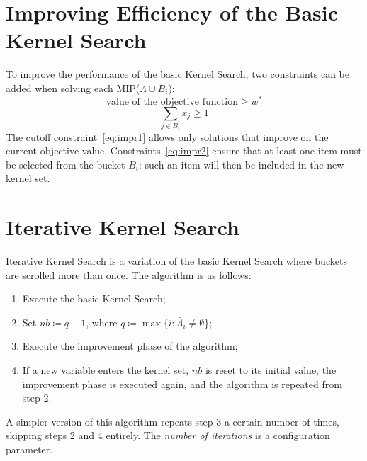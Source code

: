 \section{Improving Efficiency of the Basic Kernel Search}\label{sec:improving-efficiency}
To improve the performance of the basic Kernel Search, two constraints can be added
when solving each MIP(\(\Lambda \cup B_{i}\)):
\begin{equation}
    \label{eq:impr1}
    \text{value of the objective function} \geq w^{*}
\end{equation}
\begin{equation}
    \label{eq:impr2}
    \sum_{j \in B_{i}} x_{j} \geq 1
\end{equation}
The cutoff constraint~\eqref{eq:impr1} allows only solutions that improve on the current
objective value.
Constraints~\eqref{eq:impr2} ensure that at least one item must be selected from the bucket \(B_{i}\):
such an item will then be included in the new kernel set.


\section{Iterative Kernel Search}\label{sec:iter}
Iterative Kernel Search is a variation of the basic Kernel Search where buckets are scrolled more than once.
The algorithm is as follows:
\begin{enumerate}
    \item Execute the basic Kernel Search;
    \item Set \(nb \coloneqq q-1\), where \(q \coloneqq \max\{i:\bar{\Lambda}_{i} \neq \emptyset\}\);
    \item Execute the improvement phase of the algorithm;
    \item If a new variable enters the kernel set, \(nb\) is reset to its initial value,
    the improvement phase is executed again, and the algorithm is repeated from step 2.
\end{enumerate}

A simpler version of this algorithm repeats step 3 a certain number of times,
skipping steps 2 and 4 entirely.
The \textit{number of iterations} is a configuration parameter.